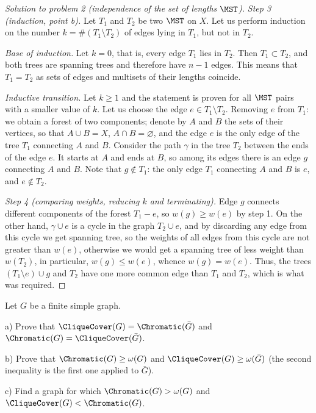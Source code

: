 \documentclass[a4paper,12pt]{report}
\begin{document}
\begin{proof}[Solution to problem \textup{2} \textup{(}independence of the set of lengths $\MST$\textup{)}]
\textit{Step \textup{3} \textup{(}induction, point \textup{b}\textup{)}.} Let $T_1$ and $T_2$ be two $\MST$ on $X$. Let us perform induction on the number $k=\#(T_1\setminus T_2)$ of edges lying in $T_1$, but not in $T_2$.

\textit{Base of induction.} Let $k=0$, that is, every edge $T_1$ lies in $T_2$. Then $T_1\subset T_2$, and both trees are spanning trees and therefore have $n-1$ edges. This means that $T_1=T_2$ as sets of edges and multisets of their lengths coincide.

\textit{Inductive transition.} Let $k\ge1$ and the statement is proven for all $\MST$ pairs with a smaller value of $k$. Let us choose the edge $e\in T_1\setminus T_2$. Removing $e$ from $T_1$\textup{:} we obtain a forest of two components\textup{;} denote by $A$ and $B$ the sets of their vertices, so that $A\cup B=X$, $A\cap B=\varnothing$, and the edge $e$ is the only edge of the tree $T_1$ connecting $A$ and $B$. Consider the path $\gamma$ in the tree $T_2$ between the ends of the edge $e$. It starts at $A$ and ends at $B$, so among its edges there is an edge $g$ connecting $A$ and $B$. Note that $g\notin T_1$\textup{:} the only edge $T_1$ connecting $A$ and $B$ is $e$, and $e\notin T_2$.

\textit{Step \textup{4} \textup{(}comparing weights, reducing $k$ and terminating\textup{)}.} Edge $g$ connects different components of the forest $T_1-e$, so $w(g)\ge w(e)$ by step 1. On the other hand, $\gamma\cup e$ is a cycle in the graph $T_2\cup e$, and by discarding any edge from this cycle we get spanning tree, so the weights of all edges from this cycle are not greater than $w(e)$, otherwise we would get a spanning tree of less weight than $w(T_2)$, in particular, $w(g)\le w(e)$, whence $w(g)=w(e)$. Thus, the trees $(T_1\setminus e)\cup g$ and $T_2$ have one more common edge than $T_1$ and $T_2$, which is what was required.
\end{proof}

\begin{task}
Let $G$ be a finite simple graph.

\textup{a)} Prove that $\CliqueCover(G)=\Chromatic(\bar G)$ and $\Chromatic(G)=\CliqueCover(\bar G)$.

\textup{b)} Prove that $\Chromatic(G)\ge\omega(G)$ and $\CliqueCover(G)\ge\omega(\bar G)$ (the second inequality is the first one applied to $\bar G$).

\textup{c)} Find a graph for which $\Chromatic(G)>\omega(G)$ and $\CliqueCover(G)<\Chromatic(G)$.

\end{task}
\end{document}
